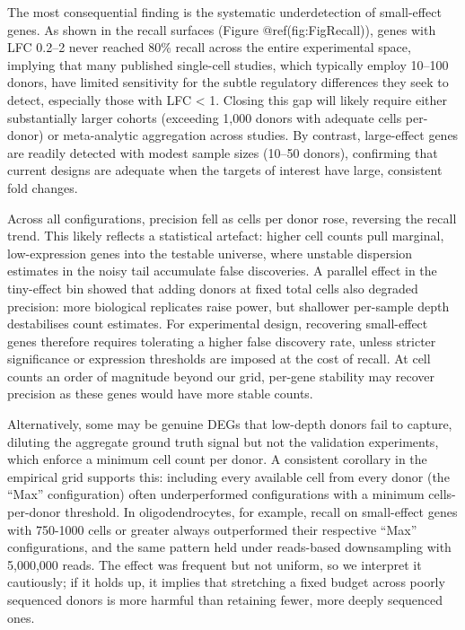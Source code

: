 \documentclass[
]{article}
\begin{document}
The most consequential finding is the systematic underdetection of
small-effect genes. As shown in the recall surfaces (Figure
@ref(fig:FigRecall)), genes with \textbar LFC\textbar{} 0.2--2 never
reached 80\% recall across the entire experimental space, implying that
many published single-cell studies, which typically employ 10--100
donors, have limited sensitivity for the subtle regulatory differences
they seek to detect, especially those with \textbar LFC\textbar{}
\textless{} 1. Closing this gap will likely require either substantially
larger cohorts (exceeding 1,000 donors with adequate cells per-donor) or
meta-analytic aggregation across studies. By contrast, large-effect
genes are readily detected with modest sample sizes (10--50 donors),
confirming that current designs are adequate when the targets of
interest have large, consistent fold changes.

Across all configurations, precision fell as cells per donor rose,
reversing the recall trend. This likely reflects a statistical artefact:
higher cell counts pull marginal, low-expression genes into the testable
universe, where unstable dispersion estimates in the noisy tail
accumulate false discoveries. A parallel effect in the tiny-effect bin
showed that adding donors at fixed total cells also degraded precision:
more biological replicates raise power, but shallower per-sample depth
destabilises count estimates. For experimental design, recovering
small-effect genes therefore requires tolerating a higher false
discovery rate, unless stricter significance or expression thresholds
are imposed at the cost of recall. At cell counts an order of magnitude
beyond our grid, per-gene stability may recover precision as these genes
would have more stable counts.

Alternatively, some may be genuine DEGs that low-depth donors fail to
capture, diluting the aggregate ground truth signal but not the
validation experiments, which enforce a minimum cell count per donor. A
consistent corollary in the empirical grid supports this: including
every available cell from every donor (the ``Max'' configuration) often
underperformed configurations with a minimum cells-per-donor threshold.
In oligodendrocytes, for example, recall on small-effect genes with
750-1000 cells or greater always outperformed their respective ``Max''
configurations, and the same pattern held under reads-based downsampling
with 5,000,000 reads. The effect was frequent but not uniform, so we
interpret it cautiously; if it holds up, it implies that stretching a
fixed budget across poorly sequenced donors is more harmful than
retaining fewer, more deeply sequenced ones.
\end{document}
